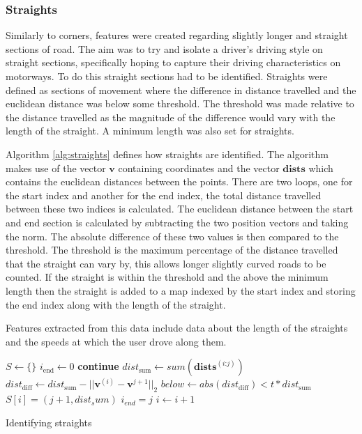\documentclass[a4paper, 11pt, twocolumn]{report}
\begin{document}
\subsubsection{Straights}

Similarly to corners, features were created regarding slightly longer and straight sections of road.
The aim was to try and isolate a driver's driving style on straight sections, specifically hoping to capture their driving characteristics on motorways.
To do this straight sections had to be identified.
Straights were defined as sections of movement where the difference in distance travelled and the euclidean distance was below some threshold.
The threshold was made relative to the distance travelled as the magnitude of the difference would vary with the length of the straight.
A minimum length was also set for straights.

Algorithm \ref{alg:straights} defines how straights are identified.
The algorithm makes use of the vector $\mathbf{v}$ containing coordinates and the vector $\mathbf{dists}$ which contains the euclidean distances between the points.
There are two loops, one for the start index and another for the end index, the total distance travelled between these two indices is calculated.
The euclidean distance between the start and end section is calculated by subtracting the two position vectors and taking the norm.
The absolute difference of these two values is then compared to the threshold.
The threshold is the maximum percentage of the distance travelled that the straight can vary by, this allows longer slightly curved roads to be counted.
If the straight is within the threshold and the above the minimum length then the straight is added to a map indexed by the start index and storing the end index along with the length of the straight.

Features extracted from this data include data about the length of the straights and the speeds at which the user drove along them.

\begin{algorithm}
\begin{algorithmic}
    \State $S \gets \{\}$
    \State $i_{\text{end}} \gets 0$
            \State \textbf{continue}
        \EndIf
            \State $dist_{\text{sum}} \gets sum(\mathbf{dists}^{(i\text{:}j)})$
            \State $dist_{\text{diff}} \gets dist_{\text{sum}} - ||\mathbf{v}^{(i)} - \mathbf{v}^{j+1}||_2$
            \State $below \gets abs(dist_{\text{diff}}) < t * dist_{\text{sum}}$
                \State $S[i] = (j+1, dist_sum)$
                \State $i_{end} = j$
            \EndIf
        \EndFor
        \State $i \gets i+1$
    \EndWhile
\end{algorithmic}
\caption{Identifying straights}
\label{alg:straights}
\end{algorithm}
\end{document}
